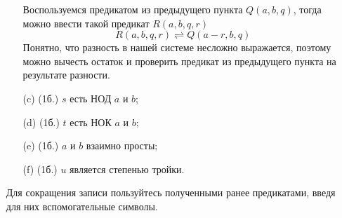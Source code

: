 \begin{enumerate}
\begin{itemize}
        \begin{solution}
            Воспользуемся предикатом из предыдущего пункта $Q(a,b,q)$, тогда можно ввести такой предикат $R(a,b,q,r)$
            \begin{equation}
                R(a,b,q,r) \rightleftharpoons Q(a - r,b,q)
            \end{equation}
            Понятно, что разность в нашей системе несложно выражается, поэтому можно вычесть остаток и проверить предикат из предыдущего пункта на результате разности.
        \end{solution}
        \item[(c)] (1б.) $s$ есть НОД $a$ и $b$;
        \item[(d)] (1б.) $t$ есть НОК $a$ и $b$;
        \item[(e)] (1б.) $a$ и $b$ взаимно просты;
        \item[(f)] (1б.) $u$ является степенью тройки.
    \end{itemize}
    Для сокращения записи пользуйтесь полученными ранее предикатами, введя для них вспомогательные символы.
    
\end{enumerate}
\clearpage
